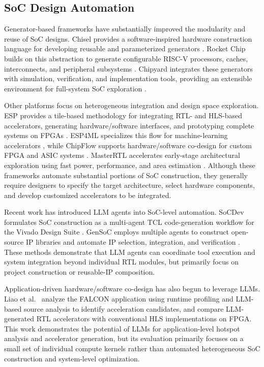 \subsection{SoC Design Automation}
Generator-based frameworks have substantially improved the modularity and reuse of SoC designs. Chisel provides a software-inspired hardware construction language for developing reusable and parameterized generators \cite{Chisel}. Rocket Chip builds on this abstraction to generate configurable RISC-V processors, caches, interconnects, and peripheral subsystems \cite{asanovic2016rocketchip}. Chipyard integrates these generators with simulation, verification, and implementation tools, providing an extensible environment for full-system SoC exploration \cite{amid2020chipyard}.

Other platforms focus on heterogeneous integration and design space exploration. ESP provides a tile-based methodology for integrating RTL- and HLS-based accelerators, generating hardware/software interfaces, and prototyping complete systems on FPGAs \cite{mantovani2020openesp}. ESP4ML specializes this flow for machine-learning accelerators \cite{esp4ml}, while ChipFlow supports hardware/software co-design for custom FPGA and ASIC systems \cite{chipflow2023}. MasterRTL accelerates early-stage architectural exploration using fast power, performance, and area estimation \cite{fang2025transferableppa}. Although these frameworks automate substantial portions of SoC construction, they generally require designers to specify the target architecture, select hardware components, and develop customized accelerators to be integrated.

Recent work has introduced LLM agents into SoC-level automation. 
SoCDev formulates SoC construction as a multi-agent TCL code-generation 
workflow for the Vivado Design Suite \cite{socdev2025}. 
GenSoC employs multiple agents to construct open-source IP libraries and 
automate IP selection, integration, and verification \cite{gensoc2025}. 
These methods demonstrate that LLM agents can coordinate tool execution 
and system integration beyond individual RTL modules, but primarily focus 
on project construction or reusable-IP composition.

Application-driven hardware/software co-design has also begun to leverage 
LLMs. Liao et al.~\cite{LiaoAL26} analyze the FALCON application using 
runtime profiling and LLM-based source analysis to identify acceleration 
candidates, and compare LLM-generated RTL accelerators with conventional 
HLS implementations on FPGA. This work demonstrates the potential of LLMs 
for application-level hotspot analysis and accelerator generation, but its 
evaluation primarily focuses on a small set of individual compute kernels 
rather than automated heterogeneous SoC construction and system-level 
optimization.

